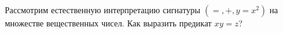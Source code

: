 Рассмотрим естественную интерпретацию сигнатуры $(=, +, y = x^2)$ на множестве вещественных чисел. Как
выразить предикат $xy = z$?
